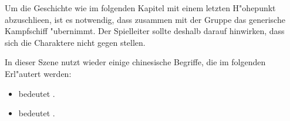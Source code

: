 \begin{remarks}
	Um die Geschichte wie im folgenden Kapitel mit einem letzten H"ohepunkt abzuschlie\3en, ist es notwendig, dass \xl{} zusammen mit der Gruppe das generische Kampfschiff "ubernimmt. Der Spielleiter sollte deshalb darauf hinwirken, dass sich die Charaktere nicht gegen \xl{} stellen.

	In dieser Szene nutzt \xl{} wieder einige chinesische Begriffe, die im folgenden Erl"autert werden:

	\begin{itemize}
		\item {} bedeutet .
		\item {} bedeutet .		
	\end{itemize}
	 
\end{remarks}

